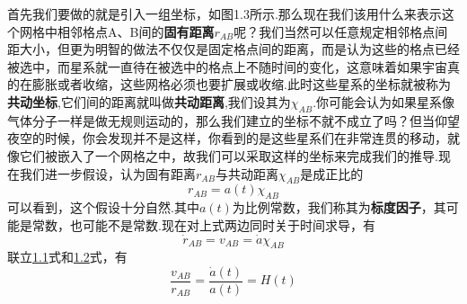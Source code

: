 \documentclass[a4paper]{book}
\begin{document}
首先我们要做的就是引入一组坐标，如图1.3所示.那么现在我们该用什么来表示这个网格中相邻格点A、B间的\textbf{固有距离}$r_{AB}$呢？我们当然可以任意规定相邻格点间距大小，但更为明智的做法不仅仅是固定格点间的距离，而是认为这些的格点已经被选中，而星系就一直待在被选中的格点上不随时间的变化，这意味着如果宇宙真的在膨胀或者收缩，这些网格必须也要扩展或收缩.此时这些星系的坐标就被称为\textbf{共动坐标},它们间的距离就叫做\textbf{共动距离},我们设其为$\chi_{AB}$.你可能会认为如果星系像气体分子一样是做无规则运动的，那么我们建立的坐标不就不成立了吗？但当仰望夜空的时候，你会发现并不是这样，你看到的是这些星系们在非常连贯的移动，就像它们被嵌入了一个网格之中，故我们可以采取这样的坐标来完成我们的推导.现在我们进一步假设，认为固有距离$r_{AB}$与共动距离$\chi_{AB}$是成正比的
\begin{equation}\label{1.1}
	r_{AB}=a(t)\chi_{AB}
\end{equation}
可以看到，这个假设十分自然.其中$a(t)$为比例常数，我们称其为\textbf{标度因子}，其可能是常数，也可能不是常数.现在对上式两边同时关于时间求导，有
\begin{equation}\label{1.2}
	\dot{r}_{AB}=v_{AB}=\dot{a}\chi_{AB}
\end{equation}
联立\hyperref[1.1]{1.1}式和\hyperref[1.2]{1.2}式，有
\begin{equation}\label{1.3}
	\frac{v_{AB}}{r_{AB}}=\frac{\dot{a}(t)}{a(t)}=H(t)
\end{equation}
\end{document}
